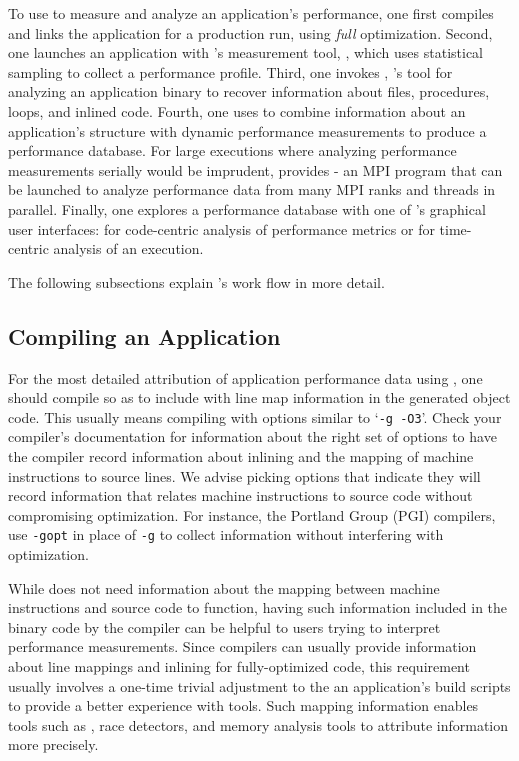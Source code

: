 \documentclass[11pt,letterpaper]{report}
\begin{document}
To use \HPCToolkit{} to measure and analyze an application's performance, one first compiles and links the application for a production run, using \emph{full} optimization.
Second, one launches an application with \HPCToolkit{}'s measurement tool, \hpcrun{}, which uses statistical sampling to collect a performance profile.
Third, one invokes \hpcstruct{}, \HPCToolkit{}'s tool for analyzing an application binary to recover information about files, procedures, loops, and inlined code.
Fourth, one uses \hpcprof{} to combine information about an application's structure with dynamic performance measurements to produce a performance database.
For large executions where analyzing performance measurements serially would be imprudent, \HPCToolkit{}  provides \hpcprofmpi{} - an MPI program that can be launched to analyze  performance data from many MPI ranks and threads in parallel.
Finally, one explores a performance database with one of \HPCToolkit{}'s graphical user interfaces: \hpcviewer{} for code-centric analysis of performance metrics or  \hpctraceviewer{} for time-centric analysis of an execution. 

The following subsections explain \HPCToolkit{}'s work flow in more detail.



\subsection{Compiling an Application}

For the most detailed attribution of application performance data using \HPCToolkit{}, one should compile so as to include with line map information in the generated object code.
This usually means compiling with options similar to `\texttt{-g -O3}'. Check your compiler's documentation for information about the right set of options to have the compiler record information about inlining and the mapping of machine instructions to source lines. We advise picking  options that indicate they will record information that relates machine instructions to source code without compromising optimization. For instance, the Portland Group (PGI) compilers, use \texttt{-gopt} in place of \texttt{-g} to collect information without interfering with optimization.

While \HPCToolkit{} does not need information about the mapping between machine instructions and source code to function, having such information included in the binary code by the compiler can be helpful to users trying to interpret performance measurements.
Since compilers can usually provide information about line mappings and inlining for fully-optimized code, this requirement usually involves a one-time trivial adjustment to the an application's build scripts to provide a better experience with tools. Such mapping information enables tools such as \HPCToolkit{}, race detectors, and memory analysis tools to attribute information more precisely.
\end{document}
